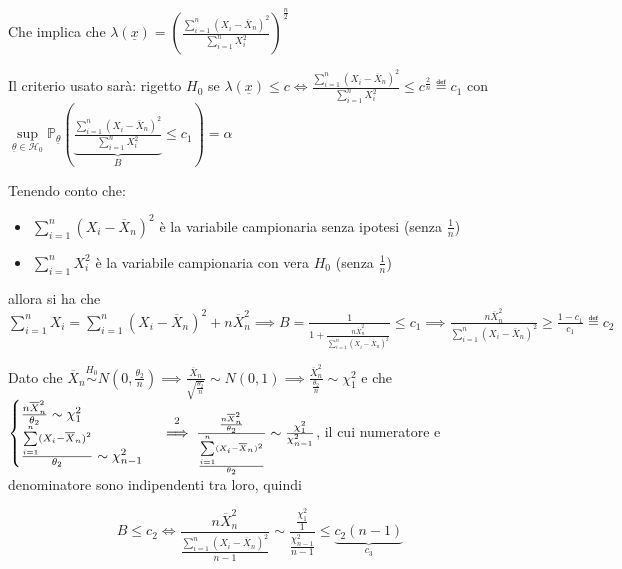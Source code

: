 \documentclass[hidelinks, 10pt]{report}
\begin{document}
\begin{es}
Che implica che $ \lambda (\underline{x}) = \left( \frac{\sum\limits_{i = 1}^{n} (X_{i} - \overline{X}_{n})^{2}}{\sum\limits_{i = 1}^{n} X_{i}^{2}} \right)^{\frac{n}{2}} $

Il criterio usato sar\`a: rigetto $ H_{0} $ se $ \lambda(\underline{x}) \le c \iff \frac{\sum\limits_{i = 1}^{n} (X_{i} - \overline{X}_{n})^{2}}{\sum\limits_{i = 1}^{n} X_{i}^{2}} \le c^{\frac{2}{n}} \eqdef c_{1} $ con $ \sup\limits_{\underline{\theta} \in \mathcal{H}_{0}} \mathbb{P}_{\underline{\theta}} \left( \underbrace{\frac{\sum\limits_{i = 1}^{n} (X_{i} - \overline{X}_{n})^{2}}{\sum\limits_{i = 1}^{n} X_{i}^{2}}}_{B} \le c_{1} \right) = \alpha $

Tenendo conto che:
\begin{itemize}
\item $ \sum\limits_{i = 1}^{n} (X_{i} - \overline{X}_{n})^{2} $ \`e la variabile campionaria senza ipotesi (senza $ \frac{1}{n} $)
\item $ \sum\limits_{i = 1}^{n} X_{i}^{2} $ \`e la variabile campionaria con vera $ H_{0} $ (senza $ \frac{1}{n} $)
\end{itemize}

allora si ha che $ \sum\limits_{i = 1}^{n} X_{i} = \sum\limits_{i = 1}^{n} (X_{i} - \overline{X}_{n})^{2} + n \overline{X}_{n}^{2} \implies B = \frac{1}{1 + \frac{n \overline{X}_{n}^{2}}{\sum\limits_{i = 1}^{n} (X_{i} - \overline{X}_{n})^{2}}} \le c_{1} \implies \frac{n \overline{X}_{n}^{2}}{\sum\limits_{i = 1}^{n} (X_{i} - \overline{X}_{n})^{2}} \ge \frac{1 - c_{1}}{c_{1}} \eqdef c_{2} $

Dato che $ \overline{X}_{n} \stackrel{H_{0}}{\sim} N \left( 0, \frac{\theta_{2}}{n} \right) \implies \frac{\overline{X}_{n}}{\sqrt{\frac{\theta_{2}}{n}}} \sim N(0, 1) \implies \frac{\overline{X}_{n}^{2}}{\frac{\theta_{2}}{n}} \sim \chi^{2}_{1} $ e che $ \begin{cases} \frac{n \overline{X}_{n}^{2}}{\theta_{2}} \sim \chi^{2}_{1} \\ \frac{\sum\limits_{i = 1}^{n} (X_{i} - \overline{X}_{n})^{2}}{\theta_{2}} \sim \chi^{2}_{n - 1} \end{cases} \stackrel{\footnotemark[2]}{\implies} \frac{\frac{n \overline{X}_{n}^{2}}{\theta_{2}}}{\frac{\sum\limits_{i = 1}^{n} (X_{i} - \overline{X}_{n})^{2}}{\theta_{2}}} \sim \frac{\chi^{2}_{1}}{\chi^{2}_{n - 1}} $, il cui numeratore e denominatore sono indipendenti tra loro, quindi

\[ B \le c_{2} \iff \frac{n \overline{X}_{n}^{2}}{\frac{\sum\limits_{i = 1}^{n} (X_{i} - \overline{X}_{n})^{2}}{n - 1}} \sim \frac{\frac{\chi^{2}_{1}}{1}}{\frac{\chi^{2}_{n - 1}}{n - 1}} \le \underbrace{c_{2} (n - 1)}_{c_{3}} \]


\end{es}
\end{document}
